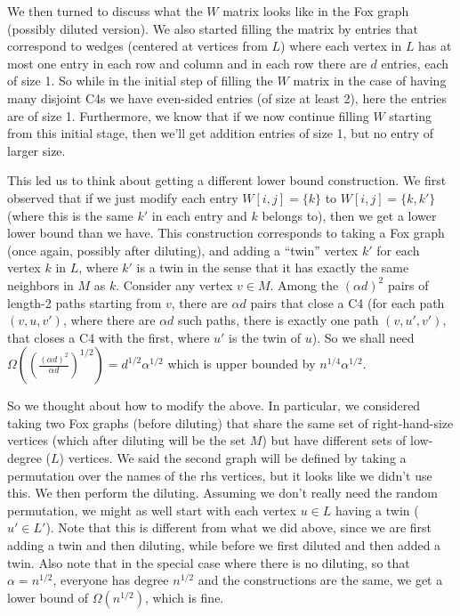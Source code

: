 \documentclass{article}
\begin{document}
\bigskip
We then turned to discuss what the $W$ matrix looks like in the Fox graph (possibly diluted version). We also started filling the matrix by entries that correspond to wedges (centered at  vertices from $L$) where each  vertex in $L$ has at most one entry in each row and column and in each row there are $d$ entries, each of size 1. So while in the initial step of filling the $W$ matrix in the case of having many disjoint C4s we have even-sided entries (of size at least 2), here the entries are of size 1. Furthermore, we know that if we now continue filling $W$ starting from this initial stage, then we'll get addition entries of size 1, but no entry of larger size.

This led us to think about getting a different lower bound construction. We first observed that if we just modify each entry $W[i,j] = \{k\}$ to $W[i,j] = \{k,k'\}$ (where this is the same $k'$ in each entry and $k$ belongs to), then we get a lower lower bound than we have. This construction corresponds to taking a Fox graph (once again, possibly after diluting), and adding a ``twin'' vertex $k'$ for each  vertex $k$ in $L$, where $k'$ is a twin in the sense that it has exactly the same  neighbors in $M$ as $k$. Consider any  vertex $v \in M$. Among the $(\alpha d)^2$ pairs of length-2 paths starting from $v$, there are $\alpha d$ pairs that close a C4 (for each path $(v,u,v')$, where there are $\alpha d$ such paths, there is exactly one path $(v,u',v')$, that closes a C4 with the first, where $u'$ is the twin of $u$). So we shall need $\Omega\left(\left(\frac{(\alpha d)^2}{\alpha d}\right)^{1/2}\right) = d^{1/2}\alpha^{1/2}$ which is upper bounded by $n^{1/4}\alpha^{1/2}$.

So we thought about how to modify the above. In particular, we considered taking two Fox graphs (before diluting) that share the same set of right-hand-size vertices (which after diluting will be the set $M$) but have different sets of low-degree ($L$) vertices. We said the second graph will be defined by taking a permutation over the names of the rhs vertices, but it looks like we didn't use this. We then perform the diluting. Assuming we don't really need the random permutation, we might as well start with each  vertex $u \in L$ having a twin ($u' \in L'$). Note that this is different from what we did above, since we are first adding a twin and then diluting, while before we first diluted and then added a twin. Also note that in the special case where there is no diluting, so that $\alpha = n^{1/2}$, everyone has degree $n^{1/2}$ and the constructions are the same, we get a lower bound of $\Omega(n^{1/2})$, which is fine.
\end{document}
